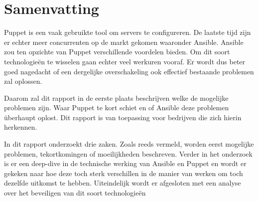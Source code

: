 





\chapter*{Samenvatting}
Puppet is een vaak gebruikte tool om servers te configureren. De laatste tijd zijn er echter meer concurrenten op de markt gekomen waaronder Ansible. Ansible zou ten opzichte van Puppet verschillende voordelen bieden. Om dit soort technologieën te wisselen gaan echter veel werkuren vooraf. Er wordt dus beter goed nagedacht of een dergelijke overschakeling ook effectief bestaande problemen zal oplossen.

Daarom zal dit rapport in de eerste plaats beschrijven welke de mogelijke problemen zijn. Waar Puppet te kort schiet en of Ansible deze problemen \"uberhaupt oplost. Dit rapport is van toepassing voor bedrijven die zich hierin herkennen.

In dit rapport onderzoekt drie zaken. Zoals reeds vermeld, worden eerst mogelijke problemen, tekortkomingen of moeilijkheden beschreven. Verder in het onderzoek is er een deep-dive in de technische werking van Ansible en Puppet en wordt er gekeken naar hoe deze toch sterk verschillen in de manier van werken om toch dezelfde uitkomst te hebben. Uiteindelijk wordt er afgesloten {\color{red}met een analyse over het beveiligen van dit soort technologie\"en}

